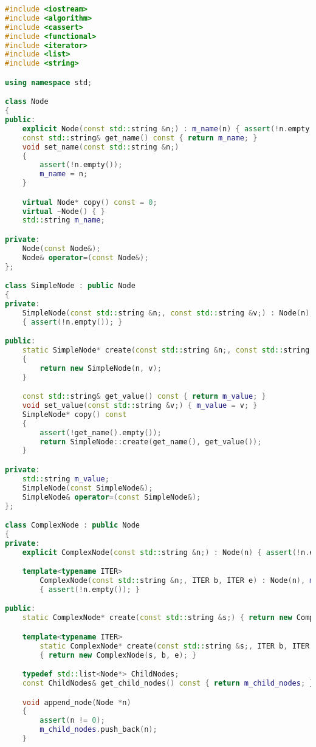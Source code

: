 \documentclass{book}
\begin{document}
\begin{lstlisting}[caption={Composite Pattern - sample 2}, language=c++]
#include <iostream>
#include <algorithm>
#include <cassert>
#include <functional>
#include <iterator>
#include <list>
#include <string>

using namespace std;

class Node
{
public:
    explicit Node(const std::string &n;) : m_name(n) { assert(!n.empty()); }
    const std::string& get_name() const { return m_name; }
    void set_name(const std::string &n;)
    {
        assert(!n.empty());
        m_name = n;
    }

    virtual Node* copy() const = 0;
    virtual ~Node() { }
    std::string m_name;

private:
    Node(const Node&);
    Node& operator=(const Node&);
};

class SimpleNode : public Node
{
private:
    SimpleNode(const std::string &n;, const std::string &v;) : Node(n), m_value(v)
    { assert(!n.empty()); }

public:
    static SimpleNode* create(const std::string &n;, const std::string &v;)
    {
        return new SimpleNode(n, v);
    }

    const std::string& get_value() const { return m_value; }
    void set_value(const std::string &v;) { m_value = v; }
    SimpleNode* copy() const
    {
        assert(!get_name().empty());
        return SimpleNode::create(get_name(), get_value());
    }

private:
    std::string m_value;
    SimpleNode(const SimpleNode&);
    SimpleNode& operator=(const SimpleNode&);
};

class ComplexNode : public Node
{
private:
    explicit ComplexNode(const std::string &n;) : Node(n) { assert(!n.empty()); }

    template<typename ITER>
        ComplexNode(const std::string &n;, ITER b, ITER e) : Node(n), m_child_nodes(b, e)
        { assert(!n.empty()); }

public:
    static ComplexNode* create(const std::string &s;) { return new ComplexNode(s); }

    template<typename ITER>
        static ComplexNode* create(const std::string &s;, ITER b, ITER e)
        { return new ComplexNode(s, b, e); }

    typedef std::list<Node*> ChildNodes;
    const ChildNodes& get_child_nodes() const { return m_child_nodes; }

    void append_node(Node *n)
    {
        assert(n != 0);
        m_child_nodes.push_back(n); 
    }


\end{lstlisting}
\end{document}

